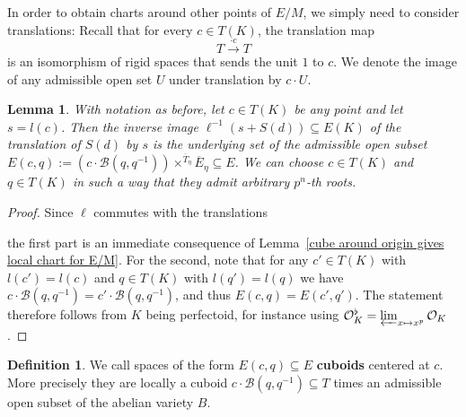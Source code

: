 \documentclass[10pt,oneside]{amsart}
\newtheorem{lemma}[theorem]{Lemma}
\theoremstyle{definition}
\newtheorem{definition}[theorem]{Definition}
\begin{document}
	In order to obtain charts around other points of $E/M$, we simply need to consider translations: Recall that for every $c\in T(K)$, the translation map
	\[T\xrightarrow{\cdot c}T\]
	is an isomorphism of rigid spaces that sends the unit $1$ to $c$. We denote the image of any admissible open set $U$ under translation by $c\cdot U$.
	
	\begin{lemma}\label{cube around point gives local chart for E/M}
		With notation as before, let $c \in T(K)$ be any point and let $s=l(c)$. Then the inverse image $\ell^{-1}(s+S(d))\subseteq E(K)$ of the translation of $S(d)$ by $s$ is the underlying set of the admissible open subset $E(c,q) := (c\cdot \mathcal B(q,q^{-1}))\times^{\overline{T}_\eta}\overline{E}_\eta \subseteq E$. We can choose $c\in T(K)$ and $q\in T(K)$ in such a way that they admit arbitrary $p^n$-th roots.
	\end{lemma}
	
	\begin{proof}
		Since $\ell$ commutes with the translations
		\begin{center}
		\end{center}
		the first part is an immediate consequence of Lemma~\ref{cube around origin gives local chart for E/M}. For the second, note that for any $c'\in T(K)$ with $l(c')=l(c)$ and $q\in T(K)$ with $l(q')=l(q)$ we have $c\cdot \mathcal B(q,q^{-1}) = c'\cdot \mathcal B(q,q^{-1})$, and thus $E(c,q)=E(c',q')$. The statement therefore follows from $K$ being perfectoid, for instance using $\mathcal O_K^\flat = \varprojlim_{x\mapsto x^p}\mathcal O_K$.
	\end{proof}
    
    \begin{definition}\label{defininition of cuboid}
		We call spaces of the form $E(c,q)\subseteq E$ \textbf{cuboids} centered at $c$. More precisely they are locally a cuboid   $c\cdot\mathcal B(q,q^{-1})\subseteq T$ times an admissible open subset of the abelian variety $B$. 
	\end{definition}
    
\end{document}

